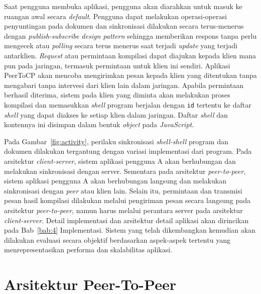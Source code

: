 Saat pengguna membuka aplikasi, pengguna akan diarahkan untuk masuk ke ruangan awal secara \textit{default}. Pengguna dapat melakukan operasi-operasi penyuntingan pada dokumen dan sinkronisasi dilakukan secara terus-menerus dengan \textit{publish-subscribe design pattern} sehingga memberikan respons tanpa perlu mengecek atau \textit{polling} secara terus menerus saat terjadi \textit{update} yang terjadi antarklien. \textit{Request} atau permintaan kompilasi dapat diajukan kepada klien mana pun pada jaringan, termasuk permintaan untuk klien ini sendiri. Aplikasi PeerToCP akan mencoba mengirimkan pesan kepada klien yang ditentukan tanpa mengabari tanpa intervesi dari klien lain dalam jaringan. Apabila permintaan berhasil diterima, sistem pada klien yang diminta akan melakukan proses kompilasi dan memasukkan \textit{shell} program berjalan dengan \texttt{id} tertentu ke daftar \textit{shell} yang dapat diakses ke setiap klien dalam jaringan. Daftar \textit{shell} dan kontennya ini disimpan dalam bentuk \textit{object} pada \textit{JavaScript}.

Pada Gambar~\ref{fig:activity}, perilaku sinkronisasi \textit{shell-shell} program dan dokumen dilakukan tergantung dengan variasi implementasi dari program. Pada arsitektur \textit{client-server}, sistem aplikasi pengguna A akan berhubungan dan melakukan sinkronisasi dengan server. Sementara pada arsitektur \textit{peer-to-peer}, sistem aplikasi pengguna A akan berhubungan langsung dan melakukan sinkronisasi dengan \textit{peer} atau klien lain. Selain itu, permintaan dan transmisi pesan hasil kompilasi dilakukan melalui pengiriman pesan secara langsung pada arsitektur \textit{peer-to-peer}, namun harus melalui perantara server pada arsitektur \textit{client-server}. Detail implementasi dan arsitektur detail aplikasi akan dirincikan pada Bab~\ref{bab:4} Implementasi. Sistem yang telah dikembangkan kemudian akan dilakukan evaluasi secara objektif berdasarkan aspek-aspek tertentu yang menrepresentasikan performa dan skalabilitas aplikasi.

\section{Arsitektur Peer-To-Peer}

